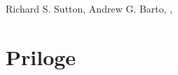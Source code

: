 \documentclass[a4paper, oneside, 12pt]{article}
\begin{document}
\begin{thebibliography}{99}
Richard S. Sutton, Andrew G. Barto,
,
\end{thebibliography}
\newpage

\section{Priloge}
\newpage
\end{document}
